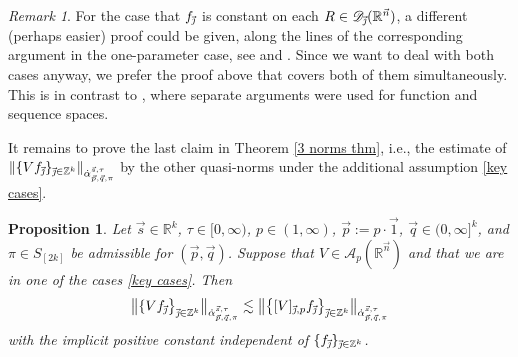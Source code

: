 \documentclass[11pt, reqno]{amsart}
\newtheorem{proposition}[theorem]{Proposition}
\theoremstyle{definition}
\theoremstyle{remark}
\newtheorem{remark}[theorem]{Remark}
\numberwithin{equation}{section}
\newcommand{\A}{\mathscr A}
\newcommand{\D}{\mathscr D}
\newcommand{\R}{\mathbb R}
\newcommand{\Z}{\mathbb Z}
\newcommand{\vone}{\vec 1}
\newcommand{\vj}{\vec{\textit{\j}}}
\newcommand{\vn}{\vec n}
\newcommand{\vp}{\vec p}
\newcommand{\vq}{\vec q}
\newcommand{\vs}{\vec s}
\newcommand{\aatau}{\dot{\alpha}^{\vs,\tau}_{\vp,\vq,\pi}}
\newcommand{\Red}[3]{[#1]_{#2,#3}}
\newcommand{\Norm}[2]{\|#1\|_{#2}}
\newcommand{\bNorm}[2]{\big\|#1\big\|_{#2}}
\begin{document}
\begin{remark}
For the case that $f_{\vj}$ is constant on each $R\in\D_{\vj}(\R^{\vn})$, a different (perhaps easier) proof could be given, along the lines of the corresponding argument in the one-parameter case, see \cite[Theorem 3.4]{FR21} and \cite[Theorem 3.28]{BHYY:1a}. Since we want to deal with both cases anyway, we prefer the proof above that covers both of them simultaneously. This is in contrast to \cite{BHYY:1a,FR21}, where separate arguments were used for function and sequence spaces.
\end{remark}

It remains to prove the last claim in Theorem \ref{3 norms thm}, i.e., the estimate of $\Norm{\{Vf_{\vj}\}_{\vj\in\Z^k}}{\aatau}$ by the other quasi-norms under the additional assumption \eqref{key cases}.


\begin{proposition}\label{V vs sup}
Let $\vs\in\R^k$, $\tau\in[0,\infty)$, $p\in(1,\infty)$, $\vp :=p\cdot\vone$, $\vq\in(0,\infty]^k$, and $\pi\in S_{[2k]}$ be admissible for $(\vp,\vq)$.
Suppose that $V\in \A_p(\R^{\vn})$ and that we are in one of the cases \eqref{key cases}. Then
\begin{equation*}
\bNorm{\{Vf_{\vj}\big\}_{\vj\in\Z^k}}{\aatau}
\lesssim\bNorm{\big\{\Red{V}{\vj}{p}f_{\vj}\big\}_{\vj\in\Z^k}}{\aatau}
\end{equation*}
with the implicit positive constant independent of
$\{f_{\vj}\}_{\vj\in\Z^k}$.
\end{proposition}
\end{document}
